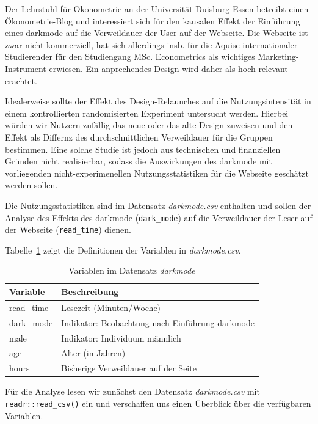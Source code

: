 \documentclass[
  a4paper,
  DIV=11,
  oneside]{scrreprt}
\begin{document}
Der Lehrstuhl für Ökonometrie an der Universität Duisburg-Essen betreibt
einen Ökonometrie-Blog und interessiert sich für den kausalen Effekt der
Einführung eines
\href{https://en.wikipedia.org/wiki/Wikipedia:Dark_mode}{darkmode} auf
die Verweildauer der User auf der Webseite. Die Webseite ist zwar
nicht-kommerziell, hat sich allerdings insb. für die Aquise
internationaler Studierender für den Studiengang MSc. Econometrics als
wichtiges Marketing-Instrument erwiesen. Ein anprechendes Design wird
daher als hoch-relevant erachtet.

Idealerweise sollte der Effekt des Design-Relaunches auf die
Nutzungsintensität in einem kontrollierten randomisierten Experiment
untersucht werden. Hierbei würden wir Nutzern zufällig das neue oder das
alte Design zuweisen und den Effekt als Differnz des durchschnittlichen
Verweildauer für die Gruppen bestimmen. Eine solche Studie ist jedoch
aus technischen und finanziellen Gründen nicht realisierbar, sodass die
Auswirkungen des darkmode mit vorliegenden nicht-experimenellen
Nutzungsstatistiken für die Webseite geschätzt werden sollen.

Die Nutzungsstatistiken sind im Datensatz
\href{https://raw.githubusercontent.com/mca91/kasa_data/main/darkmode.csv}{\emph{darkmode.csv}}
enthalten und sollen der Analyse des Effekts des darkmode
(\texttt{dark\_mode}) auf die Verweildauer der Leser auf der Webseite
(\texttt{read\_time}) dienen.

Tabelle~\ref{tbl-darkmode} zeigt die Definitionen der Variablen in
\emph{darkmode.csv}.

\hypertarget{tbl-darkmode}{}
\begin{longtable}{ll}
\caption{\label{tbl-darkmode}Variablen im Datensatz \emph{darkmode} }\tabularnewline

\toprule
Variable & Beschreibung \\ 
\midrule\addlinespace[2.5pt]
read\_time & Lesezeit (Minuten/Woche) \\ 
dark\_mode & Indikator: Beobachtung nach Einführung darkmode \\ 
male & Indikator: Individuum männlich \\ 
age & Alter (in Jahren) \\ 
hours & Bisherige Verweildauer auf der Seite \\ 
\bottomrule
\end{longtable}

Für die Analyse lesen wir zunächst den Datensatz \emph{darkmode.csv} mit
\texttt{readr::read\_csv()} ein und verschaffen uns einen Überblick über
die verfügbaren Variablen.
\end{document}
